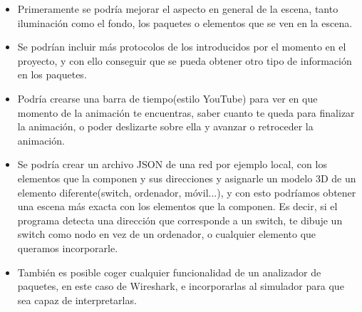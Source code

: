 \documentclass[a4paper, 12pt]{book}
\begin{document}
\begin{itemize}
    \item Primeramente se podría mejorar el aspecto en general de la escena, tanto iluminación como el fondo, los paquetes o elementos que se ven en la escena.
    
    \item Se podrían incluir más protocolos de los introducidos por el momento en el proyecto, y con ello conseguir que se pueda obtener otro tipo de información en los paquetes.
    
    \item Podría crearse una barra de tiempo(estilo YouTube) para ver en que momento de la animación te encuentras, saber cuanto te queda para finalizar la animación, o poder deslizarte sobre ella y avanzar o retroceder la animación.
    
    \item Se podría crear un archivo JSON de una red por ejemplo local, con los elementos que la componen y sus direcciones y asignarle un modelo 3D de un elemento diferente(switch, ordenador, móvil...), y con esto podríamos obtener una escena más exacta con los elementos que la componen. Es decir, si el programa detecta una dirección que corresponde a un switch, te dibuje un switch como nodo en vez de un ordenador, o cualquier elemento que queramos incorporarle.
    
    \item También es posible coger cualquier funcionalidad de un analizador de paquetes, en este caso de Wireshark, e incorporarlas al simulador para que sea capaz de interpretarlas.
\end{itemize}



\cleardoublepage




\nocite{A-Frame}

\nocite{A-Framewidgets}

\nocite{A-Framegui}

\nocite{TimeInterval}

\nocite{Timer}

\nocite{Aframe-playground}

\nocite{event}

\nocite{Javascript}

\nocite{three}
\end{document}
